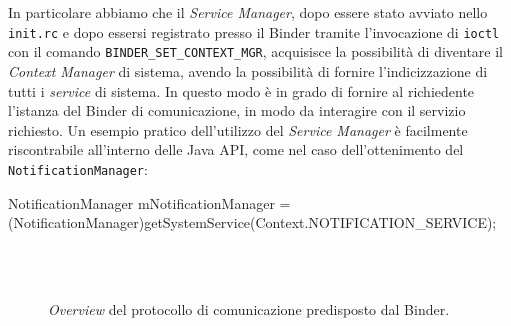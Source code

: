In particolare abbiamo che il \textit{Service Manager}, dopo essere stato
avviato nello\\
\texttt{\small init.rc} e dopo essersi registrato presso il Binder tramite l'invocazione
di \texttt{\small ioctl} con il comando \texttt{\small BINDER\_SET\_CONTEXT\_MGR}, acquisisce la possibilità
di diventare il \textit{Context Manager} di sistema, avendo  la possibilità
di fornire l'indicizzazione di tutti i \textit{service} di sistema. In
questo modo è in grado di fornire al richiedente l'istanza del Binder
di comunicazione, in modo da interagire con il servizio richiesto. Un esempio
pratico dell'utilizzo del \textit{Service Manager} è facilmente riscontrabile all'interno delle Java API, 
come nel caso dell'ottenimento del \texttt{NotificationManager}:
\begin{java}
NotificationManager mNotificationManager = (NotificationManager)getSystemService(Context.NOTIFICATION_SERVICE);
\end{java}

\begin{figure}[thp]
\centering
{}\\
\\
\caption{\textit{Overview} del protocollo di comunicazione predisposto dal Binder.}
\label{fig:androidbindhieroverview}
\end{figure}

